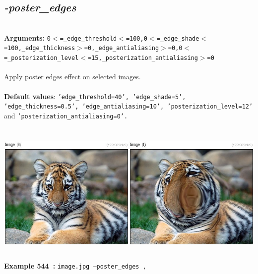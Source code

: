 \documentclass[a4paper,11pt,twoside]{book}
\begin{document}
\subsection{\emph{-poster\_edges} }\vspace*{-0.5em}
~\\\textbf{Arguments: } 
{\small \texttt{0$<$=\_edge\_threshold$<$=100,0$<$=\_edge\_shade$<$=100,\_edge\_thickness$>$=0,\_edge\_antialiasing$>$=0,0$<$=\_posterization\_level$<$=15,\_posterization\_antialiasing$>$=0}}\\~\\
Apply poster edges effect on selected images.
~\\~\\\textbf{Default values}: {\small \texttt{'edge\_threshold=40', 'edge\_shade=5', 'edge\_thickness=0.5', 'edge\_antialiasing=10', 'posterization\_level=12'} and \texttt{'posterization\_antialiasing=0'.}}
\begin{center}\includegraphics[keepaspectratio=true,height=7cm,width=\textwidth]{img/gmic_def544.jpg}\\
{\footnotesize \textbf{Example 544~:} \texttt{image.jpg --poster\_edges ,}}
\end{center}
\end{document}
